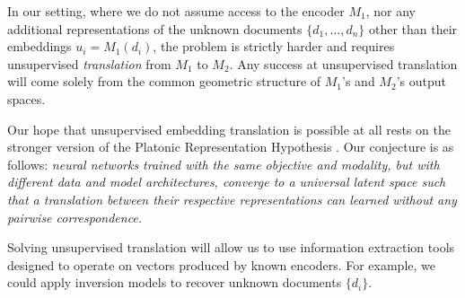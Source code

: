 



In our setting, where we do not assume access to the encoder $M_1$, nor any additional representations of the unknown documents $\{d_1, \ldots, d_n\}$ other than their embeddings $u_i=M_1(d_i)$, the problem is strictly harder and requires unsupervised \textit{translation} from $M_1$ to $M_2$. 
Any success at unsupervised translation will come solely from the common geometric structure of $M_1$'s and $M_2$'s output spaces.

Our hope that unsupervised embedding translation is possible at all rests on the stronger version of the Platonic Representation Hypothesis \citep{huh2024platonicrepresentationhypothesis}.  Our conjecture is as follows:
\emph{neural networks trained with the same objective and modality, but with different data and model architectures, converge to a universal latent space such that a translation between their respective representations can learned without any pairwise correspondence.} 



 Solving unsupervised translation will allow us to use information extraction tools designed to operate on vectors produced by known encoders. For example, we could apply inversion models \citep{morris2023textembeddingsrevealalmost, zhang2025universalzeroshotembeddinginversion} to recover unknown documents $\{d_i\}$.

